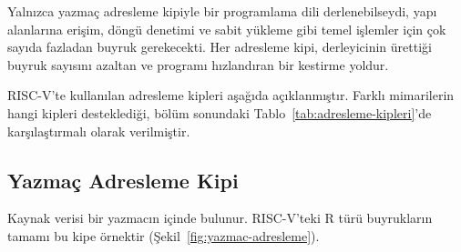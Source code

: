 Yalnızca yazmaç adresleme kipiyle bir programlama dili derlenebilseydi, yapı alanlarına erişim, döngü denetimi ve sabit yükleme gibi temel işlemler için çok sayıda fazladan buyruk gerekecekti. Her adresleme kipi, derleyicinin ürettiği buyruk sayısını azaltan ve programı hızlandıran bir kestirme yoldur.

RISC-V'te kullanılan adresleme kipleri aşağıda açıklanmıştır. Farklı mimarilerin hangi kipleri desteklediği, bölüm sonundaki Tablo~\ref{tab:adresleme-kipleri}'de karşılaştırmalı olarak verilmiştir.

\subsection{Yazmaç Adresleme Kipi}
Kaynak verisi bir yazmacın içinde bulunur. RISC-V'teki R türü buyrukların tamamı bu kipe örnektir (Şekil~\ref{fig:yazmac-adresleme}).

